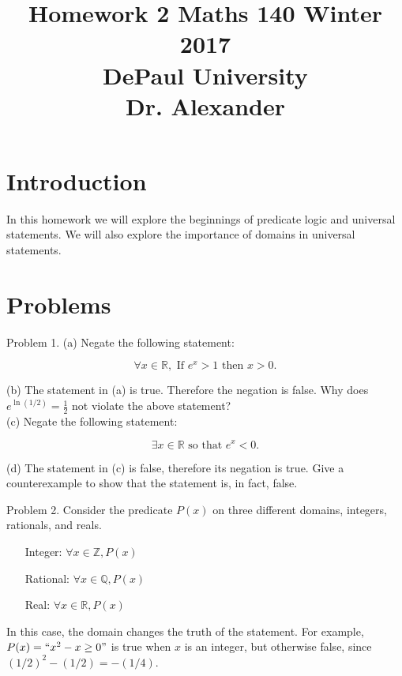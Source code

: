\documentclass[16 pt]{amsart}
\theoremstyle{definition}
\theoremstyle{remark}
\numberwithin{equation}{subsection}
\newcommand{\R}{\mathbb{R}}
\newcommand{\Z}{\mathbb{Z}}
\newcommand{\Q}{\mathbb{Q}}
\begin{document}
\title{Homework 2 Maths 140 Winter 2017 \\ DePaul University\\Dr. Alexander}
\maketitle

\section{Introduction}

In this homework we will explore the beginnings of predicate logic and universal statements.  We will also explore the importance of domains in universal statements.


\section{Problems}

Problem 1. (a) Negate the following statement:

\[
\forall x\in \R, \text{ If } e^x > 1 \text{ then } x > 0.
\]

(b) The statement in (a) is true.  Therefore the negation is false.  Why does $e^{\ln(1/2)} = \frac{1}{2}$ not violate the above statement?\\

(c) Negate the following statement:

\[
\exists x\in \R \text{ so that } e^x < 0.
\]

(d) The statement in (c) is false, therefore its negation is true.  Give a counterexample to show that the statement is, in fact, false.

\newpage

Problem 2.  Consider the predicate $P(x)$ on three different domains, integers, rationals, and reals.

\begin{itemize}
\item[Integer:] $\forall x\in \Z, P(x)$\\
\item[Rational:] $\forall x\in \Q, P(x)$\\
\item[Real:] $\forall x\in \R, P(x)$\\
\end{itemize}

In this case, the domain changes the truth of the statement.  For example, $P(x) = ``x^2-x \ge 0"$ is true when $x$ is an integer, but otherwise false, since $(1/2)^2-(1/2) = -(1/4)$.  
\end{document}
